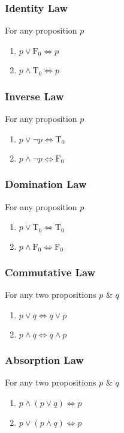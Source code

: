 \documentclass{article}
\begin{document}
	\subsubsection{Identity Law}
	For any proposition $p$
	\begin{enumerate}[label=\roman*) ]
		\item $p\lor \text{F}_0\Leftrightarrow p$
		\item $p\land \text{T}_0\Leftrightarrow p$
	\end{enumerate}

	\subsubsection{Inverse Law}
	For any proposition $p$
	\begin{enumerate}[label=\roman*) ]
		\item $p\lor\neg p\Leftrightarrow \text{T}_0$
		\item $p\land\neg p\Leftrightarrow \text{F}_0$
	\end{enumerate}

	\subsubsection{Domination Law}
	For any proposition $p$
	\begin{enumerate}[label=\roman*) ]
		\item $p\lor \text{T}_0\Leftrightarrow \text{T}_0$
		\item $p\land \text{F}_0\Leftrightarrow \text{F}_0$
	\end{enumerate}

	\subsubsection{Commutative Law}
	For any two propositions $p$ \& $q$
	\begin{enumerate}[label=\roman*) ]
		\item $p\lor q\Leftrightarrow q\lor p$
		\item $p\land q\Leftrightarrow q\land p$
	\end{enumerate}

	\subsubsection{Absorption Law}
	For any two propositions $p$ \& $q$
	\begin{enumerate}[label=\roman*) ]
		\item $p\land(p\lor q)\Leftrightarrow p$
		\item $p\lor(p\land q)\Leftrightarrow p$
	\end{enumerate}
\end{document}
